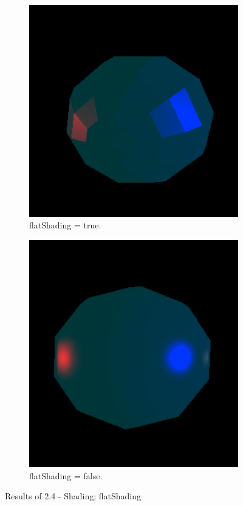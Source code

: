 \documentclass[12pt]{article}
\begin{document}
\begin{figure}[!h]
\centering
    \begin{subfigure}{.5\textwidth}
        \centering
        \includegraphics[width = \textwidth]{figs/ex_24_1.png}
        \caption{flatShading = true.}
        \label{fig:ex_24_1}
    \end{subfigure}%
    \begin{subfigure}{.5\textwidth}
        \centering
        \includegraphics[width = \textwidth]{figs/ex_24_2.png}
        \caption{flatShading = false.}
        \label{fig:ex_24_2}
    \end{subfigure}
\caption{Results of 2.4 - Shading; flatShading}
\label{fig:ex_24}
\end{figure}
\end{document}
